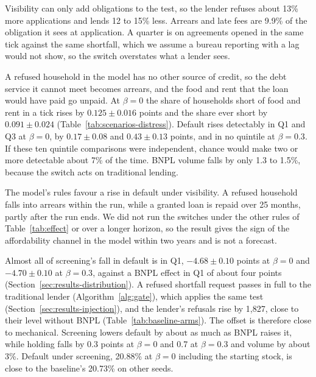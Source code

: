 Visibility can only add obligations to the test, so the lender refuses about 13\% more
applications and lends 12 to 15\% less. Arrears and late fees are 9.9\% of the obligation it
sees at application. A quarter is on agreements opened in the same tick against the same
shortfall, which we assume a bureau reporting with a lag would not show, so the switch
overstates what a lender sees.

A refused household in the model has no other source of credit, so the debt service it cannot
meet becomes arrears, and the food and rent that the loan would have paid go unpaid. At
$\beta=0$ the share of households short of food and rent in a tick rises by $0.125 \pm 0.016$
points and the share ever short by $0.091 \pm 0.024$ (Table~\ref{tab:scenarios-distress}).
Default rises detectably in Q1 and Q3 at $\beta=0$, by $0.17 \pm 0.08$ and
$0.43 \pm 0.13$ points, and in no quintile at $\beta=0.3$. If these ten quintile comparisons
were independent, chance would make two or more detectable about 7\% of the time.
\ac{BNPL} volume falls by only 1.3 to 1.5\%, because the switch acts on traditional lending.

The model's rules favour a rise in default under visibility. A refused household falls into arrears
within the run, while a granted loan is repaid over 25 months, partly after the run ends. We did not run the switches under the other rules of
Table~\ref{tab:effect} or over a longer horizon, so the result gives the sign of
the affordability channel in the model within two years and is not a forecast.

Almost all of screening's fall in default is in Q1, $-4.68 \pm 0.10$ points at $\beta=0$ and
$-4.70 \pm 0.10$ at $\beta=0.3$, against a \ac{BNPL} effect in Q1 of about four points
(Section~\ref{sec:results-distribution}). A refused shortfall request passes in full to the
traditional lender (Algorithm~\ref{alg:gate}), which applies the same test
(Section~\ref{sec:results-injection}), and the lender's
refusals rise by 1{,}827, close to their level without \ac{BNPL} (Table~\ref{tab:baseline-arms}).
The offset is therefore close to mechanical. Screening lowers default by about as much as
\ac{BNPL} raises it, while holding falls by 0.3 points at $\beta=0$ and 0.7 at $\beta=0.3$ and
volume by about 3\%. Default under screening, 20.88\% at $\beta=0$ including the starting stock,
is close to the baseline's 20.73\% on other seeds.

